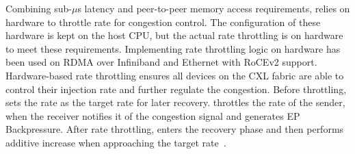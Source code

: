 Combining sub-$\mu$s latency and peer-to-peer memory access requirements, \aurelia relies on hardware to throttle rate for congestion control. 
%
The configuration of these hardware is kept on the host CPU, but the actual rate throttling is on hardware to meet these requirements.  
%
Implementing rate throttling logic on hardware has been used on RDMA over Infiniband and Ethernet with RoCEv2 support.
%
Hardware-based rate throttling ensures all devices on the CXL fabric are able to control their injection rate and further regulate the congestion.   
%
Before throttling, \aurelia sets the rate as the target rate for later recovery.
%
\aurelia throttles the rate of the sender, when the receiver notifies it of the congestion signal and generates EP Backpressure. 
%
After rate throttling, \aurelia enters the recovery phase and then performs additive increase when approaching the target rate~\cite{dcqcn:sigcomm:2015}.   



%
%


